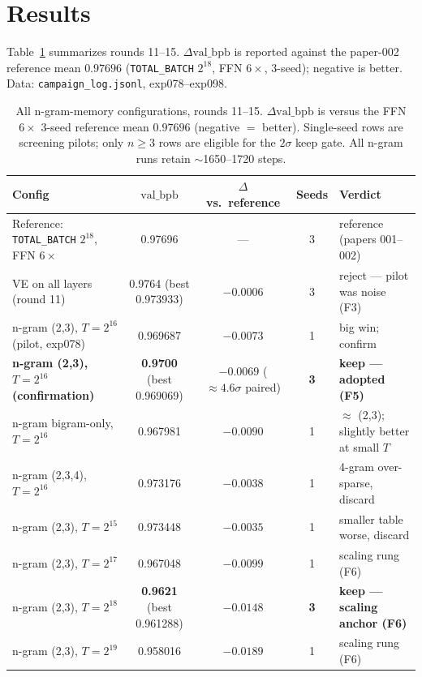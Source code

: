 \documentclass{article}
\newcommand{\valbpb}{\mathrm{val\_bpb}}
\begin{document}
\section{Results}
\label{sec:results}

Table~\ref{tab:results} summarizes rounds 11--15. $\Delta\valbpb$ is reported against the paper-002 reference mean $0.97696$ (\texttt{TOTAL\_BATCH} $2^{18}$, FFN $6\times$, 3-seed); negative is better. Data: \texttt{campaign\_log.jsonl}, exp078--exp098.

\begin{table}[t]
\caption{All n-gram-memory configurations, rounds 11--15. $\Delta\valbpb$ is versus the FFN $6\times$ 3-seed reference mean $0.97696$ (negative $=$ better). Single-seed rows are screening pilots; only $n \geq 3$ rows are eligible for the $2\sigma$ keep gate. All n-gram runs retain $\sim$1650--1720 steps.}
\label{tab:results}
\vskip 0.15in
\begin{center}
\begin{small}
\begin{tabular}{lcccl}
\toprule
Config & $\valbpb$ & $\Delta$ vs.\ reference & Seeds & Verdict \\
\midrule
Reference: \texttt{TOTAL\_BATCH} $2^{18}$, FFN $6\times$ & 0.97696 & --- & 3 & reference (papers 001--002) \\
VE on all layers (round 11) & 0.9764 (best 0.973933) & $-0.0006$ & 3 & reject --- pilot was noise (F3) \\
\midrule
n-gram (2,3), $T = 2^{16}$ (pilot, exp078) & 0.969687 & $-0.0073$ & 1 & big win; confirm \\
\textbf{n-gram (2,3), $T = 2^{16}$ (confirmation)} & \textbf{0.9700} (best 0.969069) & $-0.0069$ ($\approx 4.6\sigma$ paired) & \textbf{3} & \textbf{keep --- adopted (F5)} \\
n-gram bigram-only, $T = 2^{16}$ & 0.967981 & $-0.0090$ & 1 & $\approx$ (2,3); slightly better at small $T$ \\
n-gram (2,3,4), $T = 2^{16}$ & 0.973176 & $-0.0038$ & 1 & 4-gram over-sparse, discard \\
\midrule
n-gram (2,3), $T = 2^{15}$ & 0.973448 & $-0.0035$ & 1 & smaller table worse, discard \\
n-gram (2,3), $T = 2^{17}$ & 0.967048 & $-0.0099$ & 1 & scaling rung (F6) \\
n-gram (2,3), $T = 2^{18}$ & \textbf{0.9621} (best 0.961288) & $-0.0148$ & \textbf{3} & \textbf{keep --- scaling anchor (F6)} \\
n-gram (2,3), $T = 2^{19}$ & 0.958016 & $-0.0189$ & 1 & scaling rung (F6) \\

\end{tabular}
\end{small}
\end{center}
\end{table}
\end{document}
